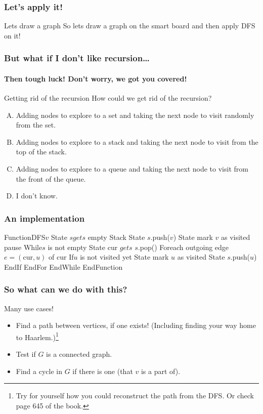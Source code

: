 \begin{frame}
	\frametitle{Let's apply it!}

	\begin{block}{Lets draw a graph}
		So lets draw a graph on the smart board and then apply DFS on it!
	\end{block}
\end{frame}

\begin{frame}
	\frametitle{But what if I don't like recursion\dots}
	\framesubtitle{Then tough luck! Don't worry, we got you covered!}

	\begin{block}{Getting rid of the recursion}
		How could we get rid of the recursion?
		\begin{enumerate}[A.]
			\item Adding nodes to explore to a set and taking the next node to visit randomly from the set.
			\item Adding nodes to explore to a stack and taking the next node to visit from the top of the stack.
			\item Adding nodes to explore to a queue and taking the next node to visit from the front of the queue.
			\item I don't know.
		\end{enumerate}
	\end{block}
\end{frame}

\begin{frame}
	\frametitle{An implementation}
	
	\begin{block}
		Function{DFS}{$v$}
		State $s gets$ empty Stack
		State $s$.push($v$)
		State mark $v$ as visited
		pause
		While{$s$ is not empty}
		State cur $gets$ $s$.pop()
		\pause
		For{each outgoing edge $e=(\text{cur},u)$ of $\text{cur}$}
		If{$u$ is not visited yet}
		State mark $u$ as visited
		\pause
		State $s$.push($u$)
		EndIf
		EndFor
		EndWhile
		EndFunction
	\end{block}
\end{frame}

\begin{frame}
	\frametitle{So what can we do with this?}

		\begin{block}{Many use cases!}
			\begin{itemize}
				\item Find a path between vertices, if one exists! (Including finding your way home to Haarlem.)\footnote{Try for
					yourself how you could reconstruct the path from the DFS. Or check page 645 of the book.}
					\pause
				\item Test if $G$ is a connected graph.
					\pause
				\item Find a cycle in $G$ if there is one (that $v$ is a part of).
			\end{itemize}
			
		\end{block}	
\end{frame}

